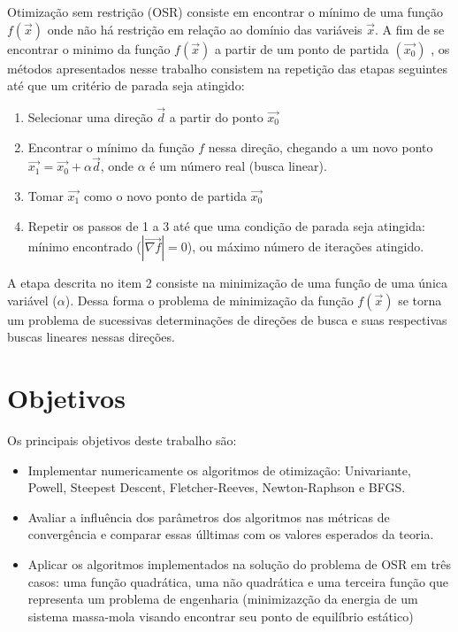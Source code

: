 \documentclass[10pt, a4paper]{article}
\begin{document}
Otimiza\c c\~ao sem restri\c c\~ao (OSR) consiste em encontrar o m\'inimo de uma fun\c c\~ao $f(\vec{x})$ onde n\~ao h\'a restri\c c\~ao em rela\c c\~ao ao dom\'inio das vari\'aveis $\vec{x}$. A fim de se encontrar o minimo da fun\c c\~ao $f(\vec{x})$ a partir de um ponto de partida $(\vec{x_{0}})$ , os m\'etodos apresentados nesse trabalho consistem na repeti\c c\~ao das etapas seguintes at\'e que um crit\'erio de parada seja atingido:
\begin{enumerate}
      \item Selecionar uma dire\c c\~ao $\vec{d}$ a partir do ponto $\vec{x_{0}}$
      \item Encontrar o m\'inimo da fun\c c\~ao $f$ nessa dire\c c\~ao, chegando a um novo ponto $\vec{x_{1}} = \vec{x_{0}} + \alpha\vec{d}$, onde $\alpha$ \'e um n\'umero real (busca linear).
      \item Tomar $\vec{x_{1}}$ como o novo ponto de partida $\vec{x_{0}}$
      \item Repetir os passos de 1 a 3 at\'e que uma condi\c c\~ao de parada seja atingida: m\'inimo encontrado ($|\vec{\nabla f}|=0$), ou m\'aximo n\'umero de itera\c c\~oes atingido.
\end{enumerate}

A etapa descrita no item 2 consiste na minimiza\c c\~ao de uma fun\c c\~ao de uma \'unica vari\'avel ($\alpha$). Dessa forma o problema de minimiza\c c\~ao da fun\c c\~ao $f(\vec{x})$ se torna um problema de sucessivas determina\c c\~oes de dire\c c\~oes de busca e suas respectivas buscas lineares nessas dire\c c\~oes.

\section{Objetivos}

Os principais objetivos deste trabalho s\~ao:
\begin{itemize}
      \item Implementar numericamente os algoritmos de otimiza\c c\~ao: Univariante, Powell, Steepest Descent, Fletcher-Reeves, Newton-Raphson e BFGS.
      \item Avaliar a influ\^encia dos par\^ametros dos algoritmos nas m\'etricas de converg\^encia e comparar essas \'ulltimas com os valores esperados da teoria.
      \item Aplicar os algoritmos implementados na solu\c c\~ao do problema de OSR em tr\^es casos: uma fun\c c\~ao quadr\'atica, uma n\~ao quadr\'atica e uma terceira fun\c c\~ao que representa um problema de engenharia (minimizaz\c c\~ao da energia de um sistema massa-mola visando encontrar seu ponto de equil\'ibrio est\'atico)
\end{itemize}
\end{document}

